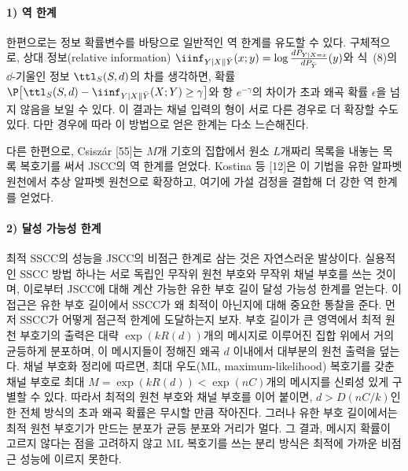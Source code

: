 \paragraph{1) 역 한계}
한편으로는 정보 확률변수를 바탕으로 일반적인 역 한계를 유도할 수 있다. 구체적으로, 상대 정보(relative information) $\iinf_{Y|X\|\bar{Y}}(x;y)=\log\frac{dP_{Y|X=x}}{dP_{\bar{Y}}}(y)$와 식~(8)의 $\dd$-기울인 정보 $\ttl_S(S,d)$의 차를 생각하면, 확률 $\P\bigl[\ttl_S(S,d)-\iinf_{Y|X\|\bar{Y}}(X;Y)\ge\gamma\bigr]$와 항 $e^{-\gamma}$의 차이가 초과 왜곡 확률 $\epsilon$을 넘지 않음을 보일 수 있다. 이 결과는 채널 입력의 형이 서로 다른 경우로 더 확장할 수도 있다. 다만 경우에 따라 이 방법으로 얻은 한계는 다소 느슨해진다.

다른 한편으로, Csiszár [55]는 $M$개 기호의 집합에서 원소 $L$개짜리 목록을 내놓는 목록 복호기를 써서 JSCC의 역 한계를 얻었다. Kostina 등 [12]은 이 기법을 유한 알파벳 원천에서 추상 알파벳 원천으로 확장하고, 여기에 가설 검정을 결합해 더 강한 역 한계를 얻었다.

\paragraph{2) 달성 가능성 한계}
최적 SSCC의 성능을 JSCC의 비점근 한계로 삼는 것은 자연스러운 발상이다. 실용적인 SSCC 방법 하나는 서로 독립인 무작위 원천 부호와 무작위 채널 부호를 쓰는 것이며, 이로부터 JSCC에 대해 계산 가능한 유한 부호 길이 달성 가능성 한계를 얻는다. 이 접근은 유한 부호 길이에서 SSCC가 왜 최적이 아닌지에 대해 중요한 통찰을 준다. 먼저 SSCC가 어떻게 점근적 한계에 도달하는지 보자. 부호 길이가 큰 영역에서 최적 원천 부호기의 출력은 대략 $\exp(kR(d))$개의 메시지로 이루어진 집합 위에서 거의 균등하게 분포하며, 이 메시지들이 정해진 왜곡 $d$ 이내에서 대부분의 원천 출력을 덮는다. 채널 부호화 정리에 따르면, 최대 우도(ML, maximum-likelihood) 복호기를 갖춘 채널 부호로 최대 $M=\exp(kR(d))<\exp(nC)$개의 메시지를 신뢰성 있게 구별할 수 있다. 따라서 최적의 원천 부호와 채널 부호를 이어 붙이면, $d>D(nC/k)$인 한 전체 방식의 초과 왜곡 확률은 무시할 만큼 작아진다. 그러나 유한 부호 길이에서는 최적 원천 부호기가 만드는 분포가 균등 분포와 거리가 멀다. 그 결과, 메시지 확률이 고르지 않다는 점을 고려하지 않고 ML 복호기를 쓰는 분리 방식은 최적에 가까운 비점근 성능에 이르지 못한다.

